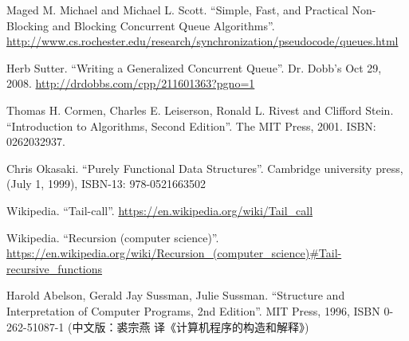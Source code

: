 \documentclass[b5paper]{ctexart}
\begin{document}
\begin{thebibliography}{99}

Maged M. Michael and Michael L. Scott. ``Simple, Fast, and Practical Non-Blocking and Blocking Concurrent Queue Algorithms''. \url{http://www.cs.rochester.edu/research/synchronization/pseudocode/queues.html}

Herb Sutter. ``Writing a Generalized Concurrent Queue''. Dr. Dobb's Oct 29, 2008. \url{http://drdobbs.com/cpp/211601363?pgno=1}

Thomas H. Cormen, Charles E. Leiserson, Ronald L. Rivest and Clifford Stein. ``Introduction to Algorithms, Second Edition''. The MIT Press, 2001. ISBN: 0262032937.

Chris Okasaki. ``Purely Functional Data Structures''. Cambridge university press, (July 1, 1999), ISBN-13: 978-0521663502

Wikipedia. ``Tail-call''. \url{https://en.wikipedia.org/wiki/Tail_call}

Wikipedia. ``Recursion (computer science)''. \url{https://en.wikipedia.org/wiki/Recursion_(computer_science)#Tail-recursive_functions}

Harold Abelson, Gerald Jay Sussman, Julie Sussman. ``Structure and Interpretation of Computer Programs, 2nd Edition''. MIT Press, 1996, ISBN 0-262-51087-1 (中文版：裘宗燕 译《计算机程序的构造和解释》)

\end{thebibliography}

\expandafter\enddocument
\fi
\end{document}
